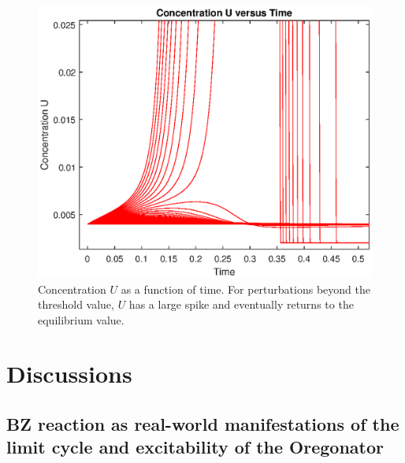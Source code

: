 \documentclass[twocolumn,amsmath,amssymb,aps]{revtex4}
\begin{document}
\begin{figure}[!htb]
	\centering
	\includegraphics[scale=0.5]{UvTime.eps}
	\caption{Concentration $U$ as a function of time. For perturbations beyond the threshold value, $U$ has a large spike and eventually returns to the equilibrium value.}
	\label{fig:Excite4}
\end{figure}





\section{Discussions}


\subsection{BZ reaction as real-world manifestations of the limit cycle and excitability of the Oregonator}
\end{document}
